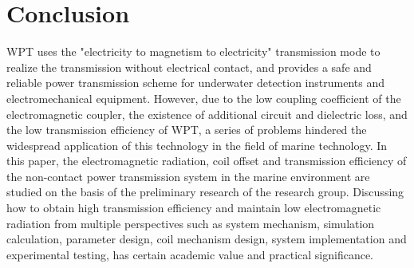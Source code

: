 \chapter{Conclusion}

WPT uses the "electricity to magnetism to electricity" transmission mode to realize the transmission without electrical contact, and provides a safe and reliable power transmission scheme for underwater detection instruments and electromechanical equipment. However, due to the low coupling coefficient of the electromagnetic coupler, the existence of additional circuit and dielectric loss, and the low transmission efficiency of WPT, a series of problems hindered the widespread application of this technology in the field of marine technology. In this paper, the electromagnetic radiation, coil offset and transmission efficiency of the non-contact power transmission system in the marine environment are studied on the basis of the preliminary research of the research group. Discussing how to obtain high transmission efficiency and maintain low electromagnetic radiation from multiple perspectives such as system mechanism, simulation calculation, parameter design, coil mechanism design, system implementation and experimental testing, has certain academic value and practical significance.


